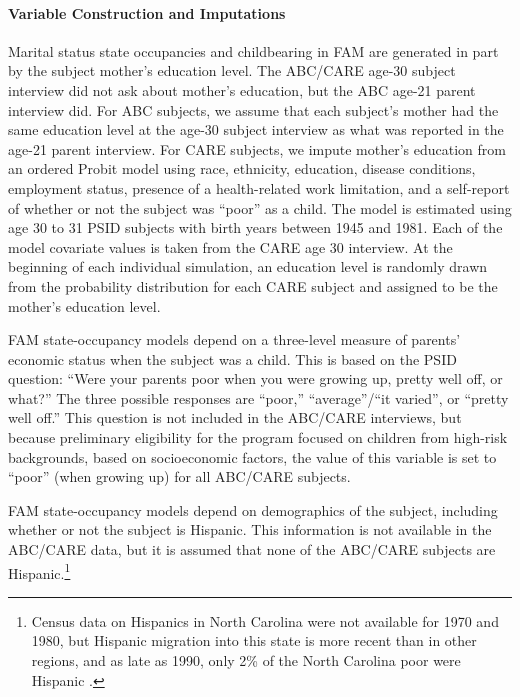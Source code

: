 \paragraph{Variable Construction and Imputations}
\label{section:FAM_ABC_impute}


\noindent Marital status state occupancies and childbearing in FAM are generated in part by the subject mother's education level. The ABC/CARE age-30 subject interview did not ask about mother's education, but the ABC age-21 parent interview did.
For ABC subjects, we assume that each subject's mother had the same education level at the age-30 subject interview as what was reported in the age-21 parent interview. For CARE subjects, we impute mother's education from an ordered Probit model using race, ethnicity, education, disease conditions, employment status, presence of a health-related work limitation, and a self-report of whether or not the subject was ``poor'' as a child.  The model is estimated using age 30 to 31 PSID subjects with birth years between 1945 and 1981. Each of the model covariate values is taken from the CARE age 30 interview. At the beginning of each individual simulation, an education level is randomly drawn from the probability distribution for each CARE subject and assigned to be the mother's education level.

\noindent FAM state-occupancy models depend on a three-level measure of parents' economic status when the subject was a child.
This is based on the PSID question: ``Were your parents poor when you were growing up, pretty well off, or what?''
The three possible responses are ``poor,'' ``average''/``it varied'', or ``pretty well off.''
This question is not included in the ABC/CARE interviews, but because preliminary eligibility for the program focused on children from high-risk backgrounds, based on socioeconomic factors, the value of this variable is set to ``poor'' (when growing up) for all ABC/CARE subjects.

\noindent FAM state-occupancy models depend on demographics of the subject, including whether or not the subject is Hispanic.
This information is not available in the ABC/CARE data, but it is assumed that none of the ABC/CARE subjects are Hispanic.\footnote{Census data on Hispanics in North Carolina were not available for 1970 and 1980, but Hispanic migration into this state is more recent than in other regions, and as late as 1990, only 2\% of the North Carolina poor were Hispanic \citep{Johnson_2003_Changing-Poverty}.}

